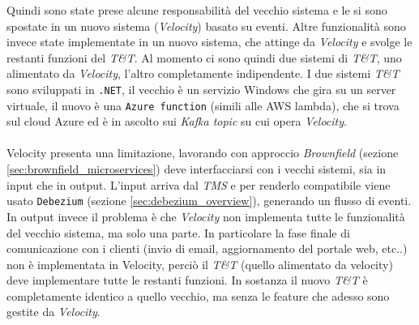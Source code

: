 Quindi sono state prese alcune responsabilità del vecchio sistema e le si sono spostate in un nuovo sistema (\textit{Velocity}) basato su eventi.
Altre funzionalità sono invece state implementate in un nuovo sistema, che attinge da \textit{Velocity} e svolge le restanti funzioni del \textit{T\&T}.
Al momento ci sono quindi due sistemi di \textit{T\&T}, uno alimentato da \textit{Velocity}, l'altro completamente indipendente.
I due sistemi \textit{T\&T} sono sviluppati in \texttt{.NET}, il vecchio è un servizio Windows che gira su un server virtuale, 
il nuovo è una \texttt{Azure function} (simili alle AWS lambda), che si trova sul cloud Azure ed è in ascolto sui \textit{Kafka topic} su cui opera \textit{Velocity}.
\\\\
Velocity presenta una limitazione, lavorando con approccio \textit{Brownfield} (sezione \ref{sec:brownfield_microservices}) deve interfacciarsi con i vecchi sistemi, sia in input che in output.
L'input arriva dal \textit{TMS} e per renderlo compatibile viene usato \texttt{Debezium} (sezione \ref{sec:debezium_overview}), generando un flusso di eventi.
In output invece il problema è che \textit{Velocity} non implementa tutte le funzionalità del vecchio sistema, ma solo una parte.
In particolare la fase finale di comunicazione con i clienti (invio di email, aggiornamento del portale web, etc..) non è implementata in Velocity,
perciò il \textit{T\&T} (quello alimentato da velocity) deve implementare tutte le restanti funzioni.
In sostanza il nuovo \textit{T\&T} è completamente identico a quello vecchio, ma senza le feature che adesso sono gestite da \textit{Velocity}.

